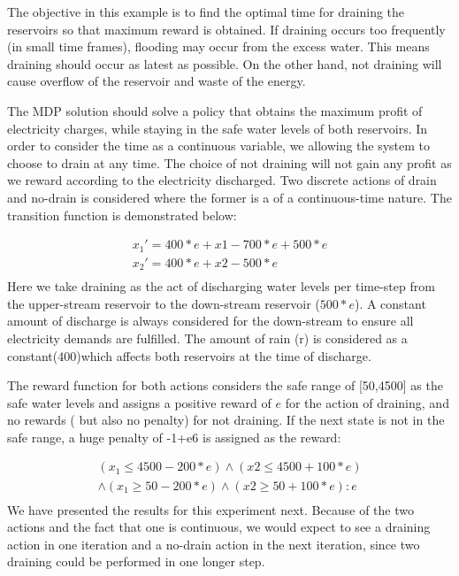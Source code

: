 The objective in this example is to find the optimal time for draining the reservoirs so that maximum reward is obtained. If draining occurs too frequently (in small time frames), flooding may occur from the excess water. This means draining should occur as latest as possible. On the other hand, not draining will cause overflow of the reservoir and waste of the energy. 

The MDP solution should solve a policy that obtains the maximum profit of electricity charges, while staying in the safe water levels of both reservoirs. In order to consider the time as a continuous variable, we allowing the system to choose to drain at any time. The choice of not draining will not gain any profit as we reward according to the electricity discharged. Two discrete actions of drain and no-drain is considered where the former is a of a continuous-time  nature. The transition function is demonstrated below: 

{\footnotesize
\begin{align*}
x_1'  = 400 * e + x1 -700 * e + 500 * e \\
x_2'  = 400 * e + x2 - 500 * e \\
\end{align*}
}
Here we take draining as the act of discharging water levels per time-step from the upper-stream reservoir to the down-stream reservoir ($500 * e$). A constant amount of discharge is always considered for the down-stream to ensure all electricity demands are fulfilled.  The amount of rain (r) is considered as a constant(400)which affects both reservoirs at the time of discharge. 

The reward function for both actions considers the safe range of [50,4500] as the safe water levels and assigns a positive reward of $e$ for the action of draining, and no rewards ( but also no penalty) for not draining. If the next state is not in the safe range, a huge penalty of -1+e6 is assigned as the reward:

{\footnotesize
\begin{align*}
(x_1\leq 4500 - 200 * e) \wedge (x2 \leq 4500 +100 *e) \\
\wedge (x_1\geq 50 - 200 * e) \wedge (x2 \geq 50 +100 *e) : e \\
\end{align*}
}
We have presented the results for this experiment next. Because of the two actions and the fact that one is continuous, we would expect to see a draining action in one iteration and a no-drain action in the next iteration, since two  draining could be performed in one longer step.


